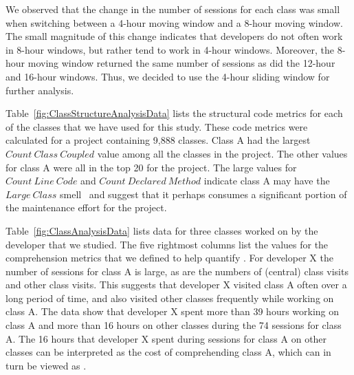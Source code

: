 We observed that the change in the number of sessions for each class was small when switching between a 4-hour moving window and a 8-hour moving window. The small magnitude of this change indicates that developers do not often work in 8-hour windows, but rather tend to work in 4-hour windows. Moreover, the 8-hour moving window returned the same number of sessions as did the 12-hour and 16-hour windows. Thus, we decided to use the 4-hour sliding window for further analysis.

Table~\ref{fig:ClassStructureAnalysisData} lists the structural code metrics for each of the classes that we have used for this study.  These code metrics were calculated for a project containing 9,888 classes. Class A had the largest $Count~Class~Coupled$ value among all the classes in the project. The other values for class A were all in the top 20  for the project. The large values for $Count~Line~Code$ and $Count~Declared~Method$ indicate class A may have the $Large~Class$ smell~\cite{Fowler_etal:1999} and suggest that it perhaps consumes a significant portion of the maintenance effort for the project. 

Table~\ref{fig:ClassAnalysisData} lists data for three classes worked on by the developer that we studied. The five rightmost columns list the values for the comprehension metrics that we defined to help quantify \TD. For developer X the number of sessions for class A is large, as are the numbers of (central) class visits and other class visits. This suggests that developer X visited class A often over a long period of time, and also visited other classes frequently while working on class A. The data show that developer X spent more than 39 hours working on class A and more than 16 hours on other classes during the 74 sessions for class A. The 16 hours that developer X spent during sessions for class A on other classes can be interpreted as the cost of comprehending class A, which can in turn be viewed as \TD.

